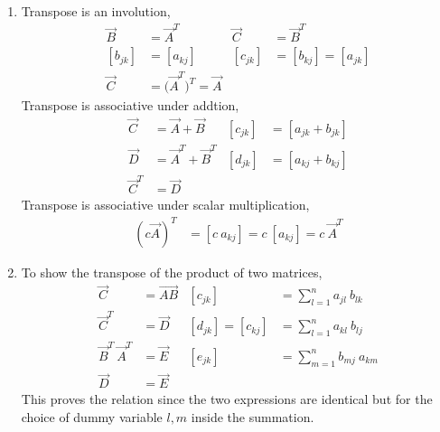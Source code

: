 \begin{enumerate}
\item Transpose is an involution,
\begin{align}
    \vec{B}  & = \vec{A}^T                         &
    \vec{C}  & = \vec{B}^T                           \\
    [b_{jk}] & = [a_{kj}]                          &
    [c_{jk}] & = [b_{kj}] = [a_{jk}]                 \\
    \vec{C}  & = \Big( \vec{A}^T \Big)^T = \vec{A}
\end{align}
Transpose is associative under addtion,
\begin{align}
    \vec{C}   & = \vec{A} + \vec{B}     &
    [c_{jk}]  & = [a_{jk} + b_{jk}]       \\
    \vec{D}   & = \vec{A}^T + \vec{B}^T &
    [d_{jk}]  & = [a_{kj} + b_{kj}]       \\
    \vec{C}^T & = \vec{D}
\end{align}
Transpose is associative under scalar multiplication,
\begin{align}
    (c\vec{A})^T & = [c\ a_{kj}] = c\ [a_{kj}] = c\ \vec{A}^T
\end{align}

\item To show the transpose of the product of two matrices,
\begin{align}
    \vec{C}              & = \vec{AB}                      &
    [c_{jk}]
                         & = \sum_{l=1}^{n} a_{jl}\ b_{lk}   \\
    \vec{C}^T            & = \vec{D}                       &
    [d_{jk}] = [c_{kj}]
                         & = \sum_{l=1}^{n} a_{kl}\ b_{lj}   \\
    \vec{B}^T\ \vec{A}^T & = \vec{E}                       &
    [e_{jk}]             & = \sum_{m=1}^{n} b_{mj}\ a_{km}   \\
    \vec{D}              & = \vec{E}                       &
\end{align}
This proves the relation since the two expressions are identical but for the
choice of dummy variable $ l,m $ inside the summation.


\end{enumerate}
